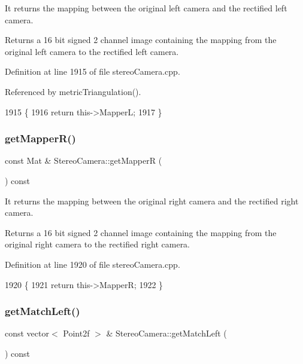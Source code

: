 It returns the mapping between the original left camera and the rectified left camera. 

\begin{DoxyReturn}{Returns}
a 16 bit signed 2 channel image containing the mapping from the original left camera to the rectified left camera. 
\end{DoxyReturn}


Definition at line 1915 of file stereo\+Camera.\+cpp.



Referenced by metric\+Triangulation().


\begin{DoxyCode}
1915                                           \{
1916     \textcolor{keywordflow}{return} this->MapperL;
1917 \}
\end{DoxyCode}
\mbox{\label{classStereoCamera_ac3f7763fdb6ed57f96924bb0b32b4ea7}} 
\subsubsection{\texorpdfstring{get\+Mapper\+R()}{getMapperR()}}
{\footnotesize\ttfamily const Mat \& Stereo\+Camera\+::get\+MapperR (\begin{DoxyParamCaption}{ }\end{DoxyParamCaption}) const}



It returns the mapping between the original right camera and the rectified right camera. 

\begin{DoxyReturn}{Returns}
a 16 bit signed 2 channel image containing the mapping from the original right camera to the rectified right camera. 
\end{DoxyReturn}


Definition at line 1920 of file stereo\+Camera.\+cpp.


\begin{DoxyCode}
1920                                           \{
1921     \textcolor{keywordflow}{return} this->MapperR;
1922 \}
\end{DoxyCode}
\mbox{\label{classStereoCamera_aa50cb648f92d099e1ffbb7bab57c3fc3}} 
\subsubsection{\texorpdfstring{get\+Match\+Left()}{getMatchLeft()}}
{\footnotesize\ttfamily const vector$<$ Point2f $>$ \& Stereo\+Camera\+::get\+Match\+Left (\begin{DoxyParamCaption}{ }\end{DoxyParamCaption}) const}



